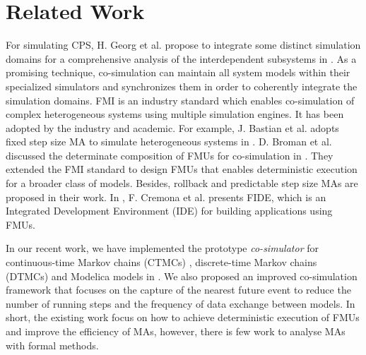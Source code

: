 \section{Related Work}
\label{sec:relateworks}
For simulating CPS, H. Georg et al. propose to integrate some distinct simulation domains for a comprehensive analysis of the interdependent subsystems in \cite{GeorgMRW14}. As a promising technique, co-simulation \cite{Bogomolov2015Co} can maintain all system models within their specialized simulators and synchronizes them in order to coherently integrate the simulation domains. FMI \cite{Blochwitz2011The}\cite{FMI2INTRO} is an industry standard which enables co-simulation of complex heterogeneous systems using multiple simulation engines. It has been adopted by the industry and academic. For example, J. Bastian et al. adopts fixed step size MA to simulate heterogeneous systems in \cite{Bastian2011Master}.
D. Broman et al. discussed the determinate composition of FMUs for co-simulation in \cite{BromanBGLMTW13}. They extended the FMI standard to design FMUs that enables deterministic execution for a broader class of models. Besides, rollback and predictable step size MAs are proposed in their work. In \cite{CremonaLTBL16}, F. Cremona et al. presents FIDE, which is an Integrated Development Environment (IDE) for building applications using FMUs. 

In our recent work, we have implemented the prototype \textit{co-simulator} for continuous-time Markov chains (CTMCs) \cite{DanosHGS17}, discrete-time Markov chains (DTMCs) \cite{Guerry13} and Modelica models in \cite{LiuJWCD16}. We also proposed an improved co-simulation framework that focuses on the capture of the nearest future event to reduce the number of running steps and the frequency of data exchange between models. In short, the existing work focus on how to achieve deterministic execution of FMUs and improve the efficiency of MAs, however, there is few work to analyse MAs with formal methods.

